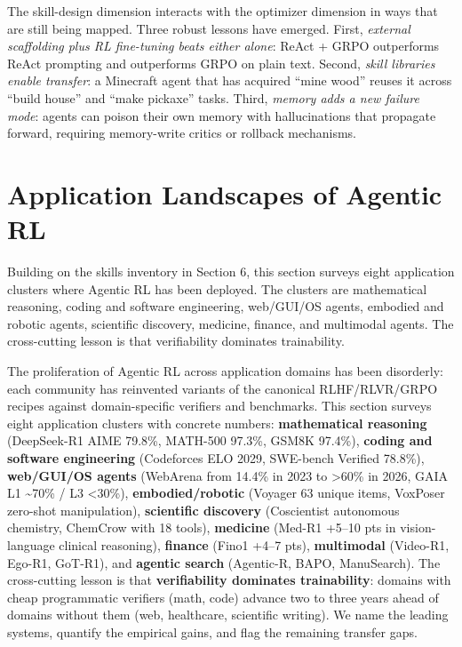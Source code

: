 The skill-design dimension interacts with the optimizer dimension in ways that are still being mapped. Three robust lessons have emerged. First, \emph{external scaffolding plus RL fine-tuning beats either alone}: ReAct + GRPO outperforms ReAct prompting and outperforms GRPO on plain text. Second, \emph{skill libraries enable transfer}: a Minecraft agent that has acquired ``mine wood'' reuses it across ``build house'' and ``make pickaxe'' tasks. Third, \emph{memory adds a new failure mode}: agents can poison their own memory with hallucinations that propagate forward, requiring memory-write critics or rollback mechanisms.

\section{Application Landscapes of Agentic RL}\label{application-landscapes-of-agentic-rl}

Building on the skills inventory in Section 6, this section surveys eight application clusters where Agentic RL has been deployed. The clusters are mathematical reasoning, coding and software engineering, web/GUI/OS agents, embodied and robotic agents, scientific discovery, medicine, finance, and multimodal agents. The cross-cutting lesson is that verifiability dominates trainability.

The proliferation of Agentic RL across application domains has been disorderly: each community has reinvented variants of the canonical RLHF/RLVR/GRPO recipes against domain-specific verifiers and benchmarks. This section surveys eight application clusters with concrete numbers: \textbf{mathematical reasoning} (DeepSeek-R1 AIME 79.8\%, MATH-500 97.3\%, GSM8K 97.4\%), \textbf{coding and software engineering} (Codeforces ELO 2029, SWE-bench Verified 78.8\%), \textbf{web/GUI/OS agents} (WebArena from 14.4\% in 2023 to \textgreater60\% in 2026, GAIA L1 \textasciitilde70\% / L3 \textless30\%), \textbf{embodied/robotic} (Voyager 63 unique items, VoxPoser zero-shot manipulation), \textbf{scientific discovery} (Coscientist autonomous chemistry, ChemCrow with 18 tools), \textbf{medicine} (Med-R1 +5--10 pts in vision-language clinical reasoning), \textbf{finance} (Fino1 +4--7 pts), \textbf{multimodal} (Video-R1, Ego-R1, GoT-R1), and \textbf{agentic search} (Agentic-R, BAPO, ManuSearch). The cross-cutting lesson is that \textbf{verifiability dominates trainability}: domains with cheap programmatic verifiers (math, code) advance two to three years ahead of domains without them (web, healthcare, scientific writing). We name the leading systems, quantify the empirical gains, and flag the remaining transfer gaps.

